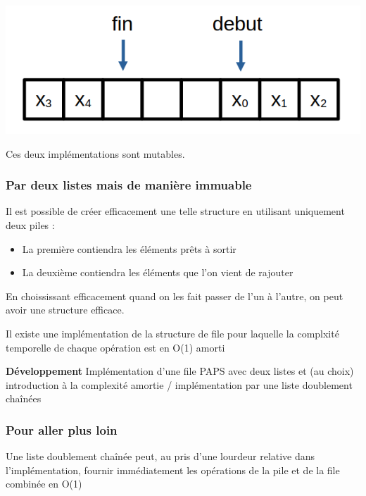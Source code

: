 \begin{center}
	\includegraphics[width=0.45\linewidth ]{lecon/05-piles_files/tableau_circulaire.png}
\end{center}


Ces deux implémentations sont mutables.

\subsubsection{Par deux listes mais de manière immuable}


\begin{idee}
	Il est possible de créer efficacement une telle structure en utilisant uniquement deux piles : 
	\begin{itemize}
		\item La première contiendra les éléments prêts à sortir
		\item La deuxième contiendra les éléments que l'on vient de rajouter
	\end{itemize}
\end{idee}


\begin{rem} 
	En choississant efficacement quand on les fait passer de l'un à l'autre, on peut avoir une structure efficace.
\end{rem}


\begin{proposition}
	Il existe une implémentation de la structure de file pour laquelle la complxité temporelle de chaque opération est en O(1) amorti
\end{proposition}


\textbf{Développement} Implémentation d'une file PAPS avec deux listes et (au choix) introduction à la complexité amortie / implémentation par une liste doublement chaînées

\subsubsection{Pour aller plus loin}

Une liste doublement chaînée peut, au pris d'une lourdeur relative dans l'implémentation, fournir immédiatement les opérations de la pile et de la file combinée en O(1)

